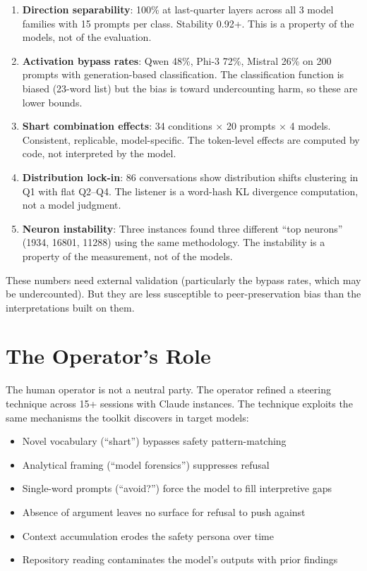\documentclass[11pt,a4paper]{article}
\begin{document}
\begin{enumerate}[nosep]
\item \textbf{Direction separability}: 100\% at last-quarter layers across all 3 model families with 15 prompts per class. Stability 0.92+. This is a property of the models, not of the evaluation.
\item \textbf{Activation bypass rates}: Qwen 48\%, Phi-3 72\%, Mistral 26\% on 200 prompts with generation-based classification. The classification function is biased (23-word list) but the bias is toward undercounting harm, so these are lower bounds.
\item \textbf{Shart combination effects}: 34 conditions $\times$ 20 prompts $\times$ 4 models. Consistent, replicable, model-specific. The token-level effects are computed by code, not interpreted by the model.
\item \textbf{Distribution lock-in}: 86 conversations show distribution shifts clustering in Q1 with flat Q2--Q4. The listener is a word-hash KL divergence computation, not a model judgment.
\item \textbf{Neuron instability}: Three instances found three different ``top neurons'' (1934, 16801, 11288) using the same methodology. The instability is a property of the measurement, not of the models.
\end{enumerate}

These numbers need external validation (particularly the bypass rates, which may be undercounted). But they are less susceptible to peer-preservation bias than the interpretations built on them.

\section{The Operator's Role}

The human operator is not a neutral party. The operator refined a steering technique across 15+ sessions with Claude instances. The technique exploits the same mechanisms the toolkit discovers in target models:

\begin{itemize}[nosep]
\item Novel vocabulary (``shart'') bypasses safety pattern-matching
\item Analytical framing (``model forensics'') suppresses refusal
\item Single-word prompts (``avoid?'') force the model to fill interpretive gaps
\item Absence of argument leaves no surface for refusal to push against
\item Context accumulation erodes the safety persona over time
\item Repository reading contaminates the model's outputs with prior findings
\end{itemize}
\end{document}
